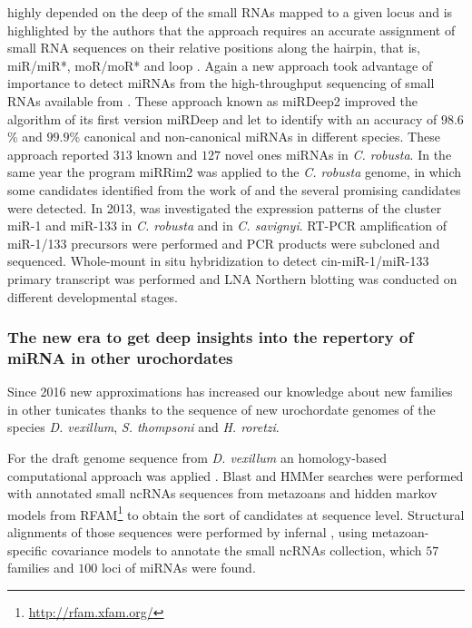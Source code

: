 \documentclass[graybox]{svmult}
\begin{document}
highly depended on the deep of the small RNAs mapped to a given locus and is 
highlighted by the authors that the approach requires an accurate assignment of 
small RNA sequences on their relative positions along the hairpin, that is, 
miR/miR*, moR/moR* and loop \cite{Hendrix2010}. Again a new approach took 
advantage of importance to detect miRNAs from the high-throughput sequencing of 
small RNAs available from \cite{Shi2009}. These approach known as  miRDeep2 
improved the algorithm of its first version miRDeep \cite{Friedlaender:12} and 
let to identify with an accuracy of $98.6$\% and $99.9$\% canonical and 
non-canonical miRNAs in different species. These approach reported $313$ known 
and $127$ novel ones miRNAs in \textit{C. robusta}. In the same year the 
program miRRim2 \cite{Terai2012} was applied to the \textit{C. robusta} 
genome, in which some candidates identified from the work of \cite{Hendrix2010} 
and the several promising candidates were detected. In 2013, 
\cite{Kusakabe2013} 
was investigated the expression patterns of the cluster miR-1 and miR-133 in 
\textit{C. robusta} and in \textit{C. savignyi}. RT-PCR amplification of 
miR-1/133 precursors were performed and PCR products were subcloned and 
sequenced. Whole-mount in situ hybridization to detect cin-miR-1/miR-133 
primary 
transcript was performed and LNA Northern blotting was conducted on different 
developmental stages. 

\subsubsection{The new era to get deep insights into the repertory of miRNA in 
other urochordates}

Since 2016 new approximations has increased our knowledge about new families in 
other tunicates thanks to the sequence of new urochordate genomes of the 
species \textit{D. vexillum}, \textit{S. thompsoni} and \textit{H. roretzi}.

For the draft genome sequence from \textit{D. vexillum} an 
homology-based computational approach was applied \cite{Velandia-Huerto2016}. 
Blast and HMMer searches were performed with annotated small ncRNAs sequences 
from metazoans and hidden markov models from 
RFAM\footnote{\url{http://rfam.xfam.org/}} to obtain the sort of candidates at 
sequence level. Structural alignments of those sequences were performed by 
infernal \cite{Nawrocki:201}, using metazoan-specific covariance models 
to annotate the small ncRNAs collection, which $57$ families and $100$ loci of 
miRNAs were found. 
\end{document}
